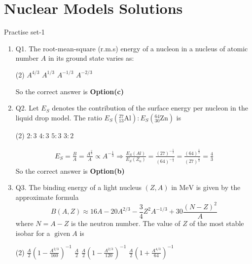 \chapter{Nuclear Models Solutions}
\begin{abox}
	Practise set-1
\end{abox}
\begin{enumerate}
	\item Q1. The root-mean-square (r.m.s) energy of a nucleon in a nucleus of atomic number $A$ in its ground state varies as:
	\begin{tasks}(2)
		\task[\textbf{a.}]$A^{4 / 3}$
		\task[\textbf{b.}]$A^{1 / 3}$
		\task[\textbf{c.}]$A^{-1 / 3}$
		\task[\textbf{d.}]$A^{-2 / 3}$ 
	\end{tasks}
	\begin{answer}
		So the correct answer is \textbf{Option(c)}
	\end{answer}
	\item Q2. Let $E_S$ denotes the contribution of the surface energy per nucleon in the liquid drop model. The ratio $E_S\left({ }_{13}^{27} \mathrm{Al}\right): E_S\left({ }_{30}^{64} \mathrm{Zn}\right)$ is
	{}
	\begin{tasks}(2)
		\task[\textbf{a.}]$2: 3$
		\task[\textbf{b.}]$4: 3$
		\task[\textbf{c.}]$5: 3$
		\task[\textbf{d.}]$3: 2$ 
	\end{tasks}
	\begin{answer}
		\begin{align*}
		E_S=\frac{B}{A}=\frac{A^{\frac{2}{3}}}{A} \propto A^{-\frac{1}{3}} \Rightarrow \frac{E_S(A l)}{E_S\left(Z_n\right)}=\frac{(27)^{-\frac{1}{3}}}{(64)^{-\frac{1}{3}}}=\frac{(64)^{\frac{1}{3}}}{(27)^{\frac{1}{3}}}=\frac{4}{3}
		\end{align*}
		So the correct answer is \textbf{Option(b)}
	\end{answer}
	\item Q3. The binding energy of a light nucleus $(Z, A)$ in $\mathrm{MeV}$ is given by the approximate formula
	$$
	B(A, Z) \approx 16 A-20 A^{2 / 3}-\frac{3}{4} Z^2 A^{-1 / 3}+30 \frac{(N-Z)^2}{A}
	$$
	where $N=A-Z$ is the neutron number. The value of $Z$ of the most stable isobar for a $\operatorname{given} A$ is
	{}
	\begin{tasks}(2)
		\task[\textbf{a.}] $\frac{A}{2}\left(1-\frac{A^{2 / 3}}{160}\right)^{-1}$
		\task[\textbf{b.}]$\frac{A}{2}$
		\task[\textbf{c.}]$\frac{A}{2}\left(1-\frac{A^{2 / 3}}{120}\right)^{-1}$
		\task[\textbf{d.}] $\frac{A}{2}\left(1+\frac{A^{4 / 3}}{64}\right)^{-1}$

\end{tasks}
\end{enumerate}
